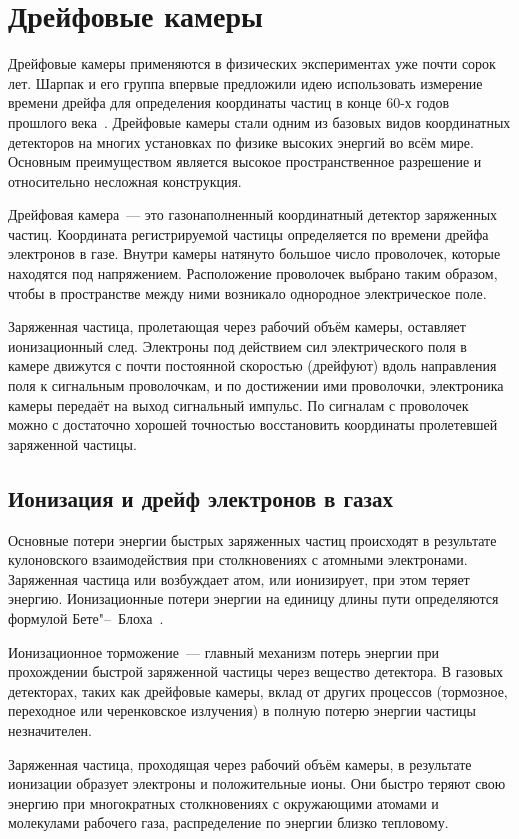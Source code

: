 \section{Дрейфовые камеры}
Дрейфовые камеры применяются в физических экспериментах уже почти сорок
лет. Шарпак и его группа впервые предложили идею использовать измерение времени
дрейфа для определения координаты частиц в конце 60-х годов прошлого
века~\cite{charpak68,charpak93}. Дрейфовые камеры стали одним из базовых видов
координатных детекторов на многих установках по физике высоких энергий во всём
мире. Основным преимуществом является высокое пространственное разрешение и
относительно несложная конструкция.

Дрейфовая камера~--- это газонаполненный координатный детектор заряженных
частиц. Координата регистрируемой частицы определяется по времени дрейфа
электронов в газе. Внутри камеры натянуто большое число проволочек, которые
находятся под напряжением. Расположение проволочек выбрано таким образом, чтобы
в пространстве между ними возникало однородное электрическое поле.

Заряженная частица, пролетающая через рабочий объём камеры, оставляет
ионизационный след. Электроны под действием сил электрического поля в камере
движутся с почти постоянной скоростью (дрейфуют) вдоль направления поля к
сигнальным проволочкам, и по достижении ими проволочки, электроника камеры
передаёт на выход сигнальный импульс. По сигналам с проволочек можно с
достаточно хорошей точностью восстановить координаты пролетевшей заряженной
частицы.

\subsection{Ионизация и дрейф электронов в газах}
Основные потери энергии быстрых заряженных частиц происходят в результате
кулоновского взаимодействия при столкновениях с атомными электронами. Заряженная
частица или возбуждает атом, или ионизирует, при этом теряет энергию.
Ионизационные потери энергии на единицу длины пути определяются формулой
Бете"--~Блоха~\cite{pdg08}.

Ионизационное торможение~--- главный механизм потерь энергии при прохождении
быстрой заряженной частицы через вещество детектора. В газовых детекторах, таких
как дрейфовые камеры, вклад от других процессов (тормозное, переходное или
черенковское излучения) в полную потерю энергии частицы незначителен.

Заряженная частица, проходящая через рабочий объём камеры, в результате
ионизации образует электроны и положительные ионы. Они быстро теряют свою
энергию при многократных столкновениях с окружающими атомами и молекулами
рабочего газа, распределение по энергии близко тепловому.

